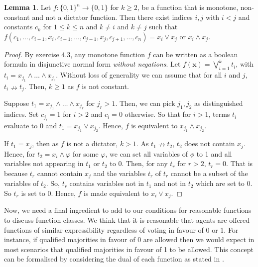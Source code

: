 \documentclass[11pt,a4paper, titlepage]{article}
\theoremstyle{definition}
\newtheorem{lemma}[theorem]{Lemma}
\let\vec\mathbf
\begin{document}
\begin{lemma}
    \label{lem:boolean}
    Let $f \colon \{0,1\}^n \longrightarrow \{0,1\}$ for $k \geq 2$, be a function that is monotone, non-constant and not a dictator function.
    Then there exist indices $i, j$ with $i < j$ and constants $c_k$ for $1 \leq k \leq n$ and $k \neq i$ and $k \neq j$ such that $f(c_1, \ldots, c_{i-1}, x_i, c_{i+1}, \ldots, c_{j-1}, x_j, c_{j+1}, \ldots, c_n) = x_i \lor x_j$ or $x_i \land x_j$.
\end{lemma}

\begin{proof}
    By \cite{boolean} exercise 4.3, any monotone function $f$ can be written as a boolean formula in disjunctive normal form \emph{without negations}.
    Let $f(\vec{x}) = \bigvee_{i = 1}^k t_i$, with $t_i = x_{j_1} \land \ldots \land x_{j_r}$.
    Without loss of generality we can assume that for all $i$ and $j$, $t_i \nrightarrow t_j$.
    Then, $k \geq 1$ as $f$ is not constant.
    
    Suppose $t_1 = x_{j_1} \land \ldots \land x_{j_r}$ for $j_r > 1$. 
    Then, we can pick $j_1, j_2$ as distinguished indices. Set $c_{j_i} = 1$ for $i > 2$ and $c_i = 0$ otherwise.
    So that for $i > 1$, terms $t_i$ evaluate to $0$ and $t_1 =x_{j_1} \lor x_{j_2}$.
    Hence, $f$ is equivalent to $x_{j_1} \land x_{j_2}$.
    
    If $t_1 = x_j$, then as $f$ is not a dictator, $k > 1$.
    As $t_1 \nrightarrow t_2$, $t_2$ does not contain $x_j$.
    Hence, for $t_2 = x_i \land \varphi$ for some $\varphi$, we can set all variables of $\phi$ to 1 and all variables not appearing in $t_1$ or $t_2$ to 0.
    Then, for any $t_r$ for $r > 2$, $t_r = 0$. That is because $t_r$ cannot contain $x_j$ and the variables $t_r$ of $t_r$ cannot be a subset of the variables of $t_2$.
    So, $t_r$ contains variables not in $t_1$ and not in $t_2$ which are set to $0$. So $t_r$ is set to 0.
    Hence, $f$ is made equivalent to $x_i \lor x_j$.
\end{proof}

Now, we need a final ingredient to add to our conditions for reasonable functions to discuss function classes.
We think that it is reasonable that agents are offered functions of similar expressibility regardless of voting in favour of 0 or 1.
For instance, if qualified majorities in favour of 0 are allowed then we would expect in most scenarios that qualified majorities in favour of 1 to be allowed.
This concept can be formalised by considering the dual of each function as stated in \cite{boolean}.
\end{document}
